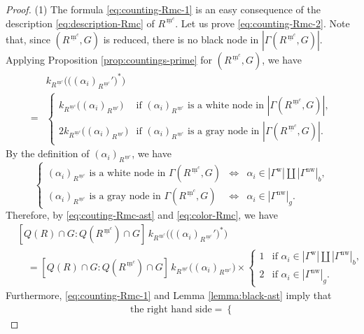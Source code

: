 \documentclass[10pt,a4paper]{amsart}
\newcommand{\mc}{\, \underline{\mathrm{m}}^c}
\newcommand{\nw}{\mathrm{nw}}
\newcommand{\w}{\mathrm{w}}
\begin{document}
\begin{proof}
(1) The formula \eqref{eq:counting-Rmc-1} is an easy consequence of the description 
\eqref{eq:description-Rmc} of $R^{\mc}$. Let us prove \eqref{eq:counting-Rmc-2}. 
Note that, since $(R^{\mc},G)$ is reduced, there is no black node in 
$|\Gamma(R^{\mc},G)|$. 
Applying Proposition \ref{prop:countings-prime} for $(R^{\mc},G)$, 
we have
\begin{equation}\label{eq:couting-Rmc-ast}
\begin{split}
&k_{R^{\mc}}\big(\big((\alpha_i)_{R^{\mc}}'\big)^\ast\big) \\
=
&
\begin{cases}
k_{R^{\mc}}\big((\alpha_i)_{R^{\mc}}\big) & 
\text{if $(\alpha_i)_{R^{\mc}}$ is a white node in $|\Gamma(R^{\mc},G)|$},\\
2k_{R^{\mc}}\big((\alpha_i)_{R^{\mc}}\big) & 
\text{if $(\alpha_i)_{R^{\mc}}$ is a gray node in $|\Gamma(R^{\mc},G)|$}.
\end{cases}
\end{split}
\end{equation}
By the definition of $(\alpha_i)_{R^{\mc}}$, we have
\begin{equation}\label{eq:color-Rmc}
\left\{\begin{array}{lllllll}
\text{$(\alpha_i)_{R^{\mc}}$ is a white node in $\Gamma(R^{\mc},G)$} 
& \Longleftrightarrow & \alpha_i\in |\Gamma^\w|\amalg |\Gamma^\nw|_b,\\[3pt]
\text{$(\alpha_i)_{R^{\mc}}$ is a gray node in $\Gamma(R^{\mc},G)$} 
& \Longleftrightarrow & \alpha_i\in |\Gamma^\nw|_g.
\end{array}\right.
\end{equation}
Therefore, by \eqref{eq:couting-Rmc-ast} and
\eqref{eq:color-Rmc}, we have
\begin{align*}
&[Q(R)\cap G:Q(R^{\mc})\cap G]\,
k_{R^{\mc}}\big(\big((\alpha_i)_{R^{\mc}}'\big)^\ast\big)\\
&\quad =[Q(R)\cap G:Q(R^{\mc})\cap G]\,
k_{R^{\mc}}\big((\alpha_i)_{R^{\mc}}\big)\times
\begin{cases}
1 & \text{if $\alpha_i\in |\Gamma^\w|\amalg |\Gamma^\nw|_b$},\\
2 & \text{if $\alpha_i\in |\Gamma^\nw|_g$}.
\end{cases}
\end{align*}
Furthermore, \eqref{eq:counting-Rmc-1} and Lemma \ref{lemma:black-ast}
imply that
\begin{align*}
&\text{the right hand side} =\begin{cases}

\end{cases}
\end{align*}
\end{proof}
\end{document}
